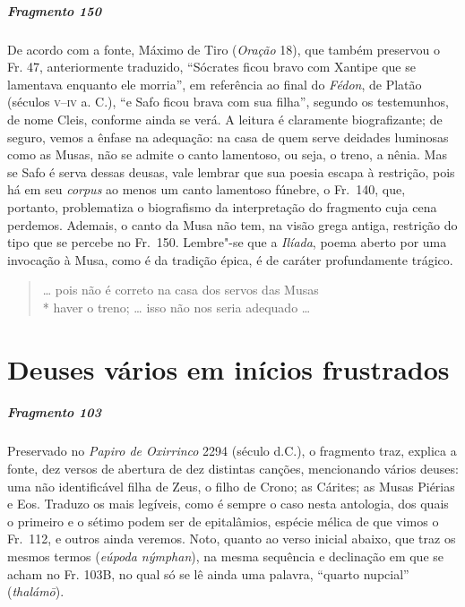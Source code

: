 {\paragraph{Fragmento 150}

{\small De acordo com a fonte, Máximo de Tiro (\textit{Oração} 18), que também preservou o Fr.
47, anteriormente traduzido, ``Sócrates ficou bravo com Xantipe que se
lamentava enquanto ele morria”, em referência ao final do \textit{Fédon}, de
Platão (séculos \textsc{v--iv} a. C.), ``e Safo ficou brava com sua filha”, segundo os testemunhos, de
nome Cleis, conforme ainda se verá. A leitura é
claramente biografizante; de seguro, vemos a ênfase na adequação: na casa de quem serve
deidades luminosas como as Musas, não se admite o canto lamentoso, ou seja, o
treno, a nênia. Mas se Safo é serva dessas deusas, vale lembrar que sua poesia
escapa à restrição, pois há em seu \textit{corpus} ao menos um canto lamentoso
fúnebre, o Fr.~140, que, portanto, problematiza o biografismo da interpretação
do fragmento cuja cena perdemos. Ademais, o canto da Musa não tem, na visão grega antiga,
restrição do tipo que se percebe no Fr.~150. Lembre"-se que a \textit{Ilíada},
poema aberto por uma invocação à Musa, como é da tradição épica, é de caráter
profundamente trágico.}

\begin{verse}
\ldots{} pois não é correto na casa dos servos das Musas\\*
haver o treno; \ldots{} isso não nos seria adequado \ldots{}
\end{verse}

\chapter{Deuses vários em inícios frustrados}


\paragraph{Fragmento 103}

{\small Preservado  no \textit{Papiro de Oxirrinco} 2294 (século  d.C.), o fragmento traz, explica a fonte, dez versos de abertura de dez distintas canções, mencionando vários deuses: uma não identificável filha de Zeus, o filho de Crono; as Cárites; as Musas Piérias e Eos. Traduzo os mais legíveis, como é sempre o caso nesta antologia, dos quais o primeiro e o sétimo podem ser de epitalâmios, espécie mélica de que vimos o Fr.~112, e outros ainda veremos.
Noto, quanto ao verso inicial abaixo, que traz os mesmos termos (\textit{eúpoda nýmphan}), na mesma sequência e declinação em que se acham no Fr. 103B, no qual só se lê ainda uma palavra, ``quarto nupcial'' (\textit{thalámō}).}

}
